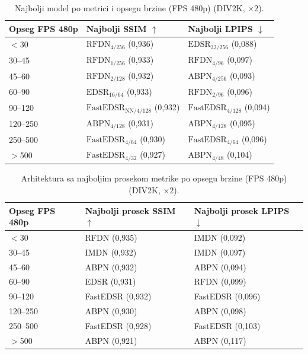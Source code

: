 
\begin{table}[H]
    \centering
    \caption{Najbolji model po metrici i opsegu brzine (FPS 480p) (DIV2K, $\times2$).}
    \label{tab:fps_bins_best_model_2x_DIV2K}
    \small
    \setlength{\tabcolsep}{4pt}
    \begin{tabular}{@{}lll@{}}
        \toprule
        Opseg FPS 480p & Najbolji SSIM $\uparrow$ & Najbolji LPIPS $\downarrow$ \\
        \midrule
        $<$30 & $\text{RFDN}_{\text{4/256}}$ (0,936) & $\text{EDSR}_{\text{32/256}}$ (0,088) \\
        30--45 & $\text{RFDN}_{\text{1/256}}$ (0,933) & $\text{RFDN}_{\text{4/96}}$ (0,097) \\
        45--60 & $\text{RFDN}_{\text{2/128}}$ (0,932) & $\text{ABPN}_{\text{4/256}}$ (0,093) \\
        60--90 & $\text{EDSR}_{\text{16/64}}$ (0,933) & $\text{RFDN}_{\text{2/96}}$ (0,096) \\
        90--120 & $\text{FastEDSR}_{\text{NN/4/128}}$ (0,932) & $\text{FastEDSR}_{\text{4/128}}$ (0,094) \\
        120--250 & $\text{ABPN}_{\text{4/128}}$ (0,931) & $\text{ABPN}_{\text{4/128}}$ (0,095) \\
        250--500 & $\text{FastEDSR}_{\text{4/64}}$ (0,930) & $\text{FastEDSR}_{\text{4/64}}$ (0,096) \\
        $>$500 & $\text{FastEDSR}_{\text{4/32}}$ (0,927) & $\text{ABPN}_{\text{4/48}}$ (0,104) \\
        \bottomrule
    \end{tabular}
\end{table}

\begin{table}[H]
    \centering
    \caption{Arhitektura sa najboljim prosekom metrike po opsegu brzine (FPS 480p) (DIV2K, $\times2$).}
    \label{tab:fps_bins_best_arch_2x_DIV2K}
    \small
    \setlength{\tabcolsep}{4pt}
    \begin{tabular}{@{}lll@{}}
        \toprule
        Opseg FPS 480p & Najbolji prosek SSIM $\uparrow$ & Najbolji prosek LPIPS $\downarrow$ \\
        \midrule
        $<$30 & RFDN (0,935) & IMDN (0,092) \\
        30--45 & IMDN (0,932) & IMDN (0,097) \\
        45--60 & ABPN (0,932) & ABPN (0,094) \\
        60--90 & EDSR (0,931) & RFDN (0,099) \\
        90--120 & FastEDSR (0,932) & FastEDSR (0,096) \\
        120--250 & ABPN (0,930) & ABPN (0,098) \\
        250--500 & FastEDSR (0,928) & FastEDSR (0,103) \\
        $>$500 & ABPN (0,921) & ABPN (0,117) \\
        \bottomrule
    \end{tabular}
\end{table}
